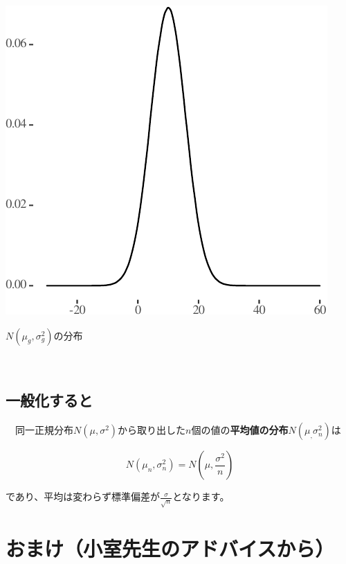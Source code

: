 \documentclass[]{tufte-handout}
\begin{document}
\begin{marginfigure}

{\centering \includegraphics{AdditivityOfVariance_files/figure-latex/unnamed-chunk-14-1} 

}

\caption[$N(\mu_g, \sigma^2_g)$の分布]{$N(\mu_g, \sigma^2_g)$の分布}\label{fig:unnamed-chunk-14}
\end{marginfigure}

　

\hypertarget{ux4e00ux822cux5316ux3059ux308bux3068}{%
\subsection{\texorpdfstring{\textbf{一般化すると}}{一般化すると}}\label{ux4e00ux822cux5316ux3059ux308bux3068}}

　同一正規分布\(N(\mu, \sigma^2)\)から取り出した\(n\)個の値の\textbf{平均値の分布}\(N(\mu_, \sigma^2_n)\)は

\[N(\mu_n, \sigma^2_n) = N(\mu, \frac{\sigma^2}{n})\]

であり、平均は変わらず標準偏差が\(\frac{\sigma}{\sqrt{n}}\)となります。

\newpage

\hypertarget{ux304aux307eux3051ux5c0fux5ba4ux5148ux751fux306eux30a2ux30c9ux30d0ux30a4ux30b9ux304bux3089}{%
\section{\texorpdfstring{\textbf{おまけ}（小室先生のアドバイスから）}{おまけ（小室先生のアドバイスから）}}\label{ux304aux307eux3051ux5c0fux5ba4ux5148ux751fux306eux30a2ux30c9ux30d0ux30a4ux30b9ux304bux3089}}
\end{document}
